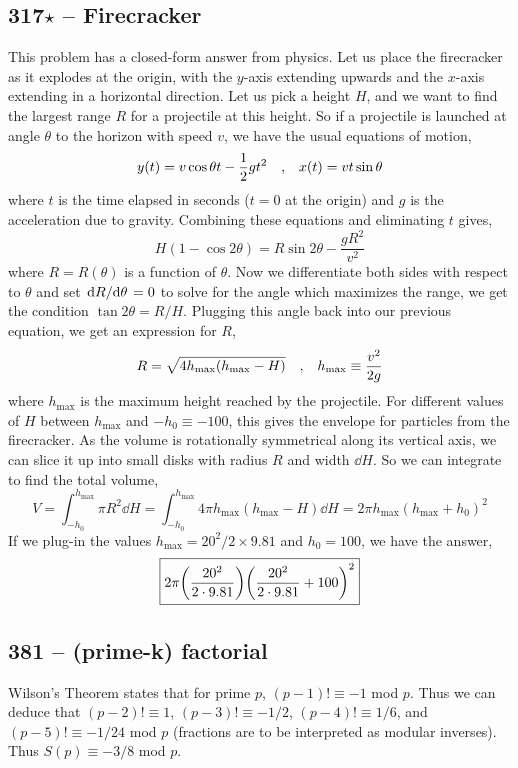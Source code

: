\documentclass{article}
\begin{document}
\subsection*{317$\star$ -- Firecracker}
This problem has a closed-form answer from physics.
Let us place the firecracker as it explodes at the origin, with the $y$-axis extending upwards and the $x$-axis extending in a horizontal direction.
Let us pick a height $H$, and we want to find the largest range $R$ for a projectile at this height.
So if a projectile is launched at angle $\theta$ to the horizon with speed $v$, we have the usual equations of motion,
\[  y(t) = v \cos\theta t - \frac{1}{2} gt^2 \qq{,} x(t) = v t \sin\theta \]
where $t$ is the time elapsed in seconds ($t=0$ at the origin) and $g$ is the acceleration due to gravity.
Combining these equations and eliminating $t$ gives,
\[ H (1 - \cos 2\theta) = R \sin 2 \theta - \frac{g R^2}{v^2} \]
where $R = R(\theta)$ is a function of $\theta$.
Now we differentiate both sides with respect to $\theta$ and set $\dv*{R}{\theta}=0$ to solve for the angle which maximizes the range, we get the condition $\tan 2\theta = R/H$.
Plugging this angle back into our previous equation, we get an expression for $R$,
\[ R = \sqrt{4 h_\text{max} (h_\text{max} - H)} \qq{,} h_\text{max} \equiv \frac{v^2}{2g} \]
where $h_\text{max}$ is the maximum height reached by the projectile.
For different values of $H$ between $h_\text{max}$ and $-h_0 \equiv - 100$, this gives the envelope for particles from the firecracker.
As the volume is rotationally symmetrical along its vertical axis, we can slice it up into small disks with radius $R$ and width $\dd{H}$.
So we can integrate to find the total volume,
\[ V = \int_{-h_0}^{h_\text{max}} \pi R^2 \dd{H} = \int_{-h_0}^{h_\text{max}} 4\pi {h_\text{max}}({h_\text{max}} - H) \dd{H} = 2 \pi h_\text{max} (h_\text{max} + h_0)^2 \]
If we plug-in the values ${h_\text{max}} = 20^2/2 \times 9.81$ and $h_0 = 100$, we have the answer,
\[ \boxed{ 2 \pi \qty(\frac{20^2}{2 \cdot 9.81}) \qty(\frac{20^2}{2 \cdot 9.81} + 100)^2 } \]

\subsection*{381 -- (prime-k) factorial} 
Wilson's Theorem states that for prime $p$, $(p-1)! \equiv -1 $ mod $p$. 
Thus we can deduce that $(p-2)! \equiv 1$, $(p-3)! \equiv -1/2$, $(p-4)! \equiv 1/6$, and $(p-5)! \equiv -1/24$ mod $p$ (fractions are to be interpreted as modular inverses). 
Thus $S(p) \equiv -3/8 $ mod $p$.
\end{document}
